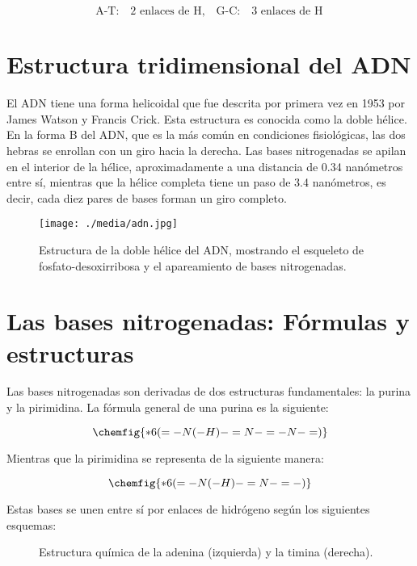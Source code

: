 \begin{equation*}
\text{A-T:} \quad \text{2 enlaces de H}, \quad \text{G-C:} \quad \text{3 enlaces de H}
\end{equation*}

\section{Estructura tridimensional del ADN}

El ADN tiene una forma helicoidal que fue descrita por primera vez en 1953 por James Watson y Francis Crick. Esta estructura es conocida como la doble hélice. En la forma B del ADN, que es la más común en condiciones fisiológicas, las dos hebras se enrollan con un giro hacia la derecha. Las bases nitrogenadas se apilan en el interior de la hélice, aproximadamente a una distancia de 0.34 nanómetros entre sí, mientras que la hélice completa tiene un paso de 3.4 nanómetros, es decir, cada diez pares de bases forman un giro completo.

\begin{figure}[h!]
\centering
\texttt{[image: ./media/adn.jpg]}
\caption{Estructura de la doble hélice del ADN, mostrando el esqueleto de fosfato-desoxirribosa y el apareamiento de bases nitrogenadas.}
\end{figure}

\section{Las bases nitrogenadas: Fórmulas y estructuras}

Las bases nitrogenadas son derivadas de dos estructuras fundamentales: la purina y la pirimidina. La fórmula general de una purina es la siguiente:

\begin{equation*}
\chemfig{*6(=-N(-H)-=N-=-N-=)}
\end{equation*}

Mientras que la pirimidina se representa de la siguiente manera:

\begin{equation*}
\chemfig{*6(=-N(-H)-=N-=-)}
\end{equation*}

Estas bases se unen entre sí por enlaces de hidrógeno según los siguientes esquemas:

\begin{figure}[h!]
\centering
{}
\quad
{}
\caption{Estructura química de la adenina (izquierda) y la timina (derecha).}
\end{figure}

